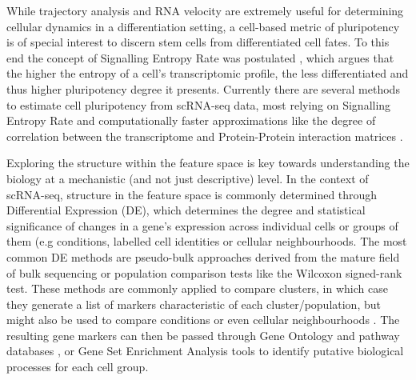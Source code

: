 While trajectory analysis and RNA velocity are extremely useful for determining cellular dynamics in a differentiation setting, a cell-based metric of pluripotency is of special interest to discern stem cells from differentiated cell fates. To this end the concept of Signalling Entropy Rate was postulated \cite{teschendorff_signalling_2014}, which argues that the higher the entropy of a cell's transcriptomic profile, the less differentiated and thus higher pluripotency degree it presents. Currently there are several methods to estimate cell pluripotency from scRNA-seq data, most relying on Signalling Entropy Rate and computationally faster approximations like the degree of correlation between the transcriptome and Protein-Protein interaction matrices \cite{teschendorff_single-cell_2017,gulati_single-cell_2020,senra_origins_2022}. 

Exploring the structure within the feature space is key towards understanding the biology at a mechanistic (and not just descriptive) level. In the context of scRNA-seq, structure in the feature space is commonly determined through Differential Expression (DE), which determines the degree and statistical significance of changes in a gene's expression across individual cells or groups of them (e.g conditions, labelled cell identities or cellular neighbourhoods. The most common DE methods are pseudo-bulk approaches derived from the mature field of bulk sequencing \cite{robinson_edger_2010,finak_mast_2015} or population comparison tests like the Wilcoxon signed-rank test. These methods are commonly applied to compare clusters, in which case they generate a list of markers characteristic of each cluster/population,  but might also be used to compare conditions or even cellular neighbourhoods \cite{missarova_sensitive_2023}. The resulting gene markers can then be passed through Gene Ontology \cite{ashburner_gene_2000} and pathway databases \cite{kanehisa_kegg_2017,turei_integrated_2021,gillespie_reactome_2022}, or Gene Set Enrichment Analysis tools \cite{subramanian_gene_2005} to identify putative biological processes for each cell group. 


